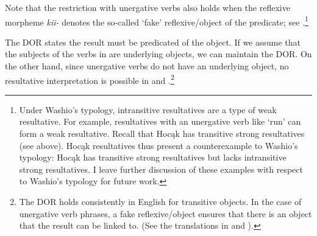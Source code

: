 \documentclass[output=paper]{LSP/langsci}
\begin{document}
\begin{exe}
\ex\label{ex:rosen:20}
\begin{xlist}



\end{xlist}
\end{exe}

Note that the restriction with unergative verbs also holds when the reflexive morpheme \textit{kii-} denotes the so-called `fake' reflexive/object of the predicate; see .\footnote{Under Washio's  typology, intransitive resultatives are a type of weak resultative. For example, resultatives with an unergative verb like `run' can form a weak resultative. Recall that Hocąk has transitive strong resultatives (see  above). Hocąk resultatives thus present a counterexample to Washio's typology: Hocąk has transitive strong resultatives but lacks intransitive strong resultatives. I leave further discussion of these examples with respect to Washio's typology for future work.}

\begin{exe}


\end{exe}

The DOR states the result must be predicated of the object. If we assume that the subjects of the verbs in  are underlying objects, we can maintain the DOR. On the other hand, since unergative verbs do not have an underlying object, no resultative interpretation is possible in  and .\footnote{The DOR holds consistently in English for transitive objects. In the case of unergative verb phrases, a fake reflexive/object ensures that there is an object that the result can be linked to. (See the translations in  and ).}
\end{document}
